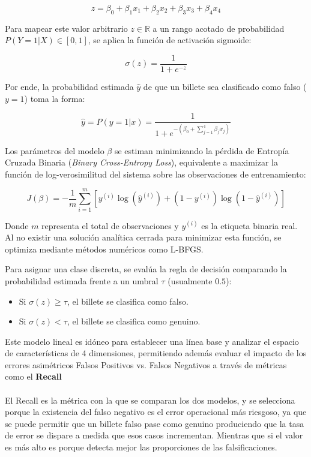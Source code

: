 \documentclass[conference]{IEEEtran}
\begin{document}
	\begin{equation}
		z = \beta_0 + \beta_1 x_1 + \beta_2 x_2 + \beta_3 x_3 + \beta_4 x_4
	\end{equation}
	
	Para mapear este valor arbitrario $z \in \mathbb{R}$ a un rango acotado de probabilidad $P(Y=1 | X) \in [0, 1]$, se aplica la función de activación sigmoide:
	
	\begin{equation}
		\sigma(z) = \frac{1}{1 + e^{-z}}
	\end{equation}
	
	Por ende, la probabilidad estimada $\hat{y}$ de que un billete sea clasificado como falso ($y=1$) toma la forma:
	
	\begin{equation}
		\hat{y} = P(y=1 | x) = \frac{1}{1 + e^{-(\beta_0 + \sum_{j=1}^{4} \beta_j x_j)}}
	\end{equation}
	
	Los parámetros del modelo $\beta$ se estiman minimizando la pérdida de Entropía Cruzada Binaria (\textit{Binary Cross-Entropy Loss}), equivalente a maximizar la función de log-verosimilitud del sistema sobre las observaciones de entrenamiento:
	
	\begin{equation}
		J(\beta) = -\frac{1}{m} \sum_{i=1}^{m} \left[ y^{(i)} \log(\hat{y}^{(i)}) + (1 - y^{(i)}) \log(1 - \hat{y}^{(i)}) \right]
	\end{equation}
	
	Donde $m$ representa el total de observaciones y $y^{(i)}$ es la etiqueta binaria real. Al no existir una solución analítica cerrada para minimizar esta función, se optimiza mediante métodos numéricos como L-BFGS\cite{aws_logistic_regression}.
	
	Para asignar una clase discreta, se evalúa la regla de decisión comparando la probabilidad estimada frente a un umbral $\tau$ (usualmente $0.5$):
	\begin{itemize}
		\item Si $\sigma(z) \ge \tau$, el billete se clasifica como falso.
		\item Si $\sigma(z) < \tau$, el billete se clasifica como genuino.
	\end{itemize}
	
	Este modelo lineal es idóneo para establecer una línea base y analizar el espacio de características de 4 dimensiones, permitiendo además evaluar el impacto de los errores asimétricos Falsos Positivos vs. Falsos Negativos a través de métricas como el \textbf{Recall}
	\\	\\	
	El Recall es la métrica con la que se comparan los dos modelos, y se selecciona porque la existencia del falso negativo es el error operacional más riesgoso, ya que se puede permitir que un billete falso pase como genuino produciendo que la tasa de error se dispare a medida que esos casos incrementan. Mientras que si el valor es más alto es porque detecta mejor las proporciones de las falsificaciones. 
	
\end{document}
